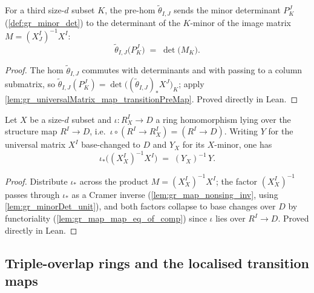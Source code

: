 \begin{lemma}\leanok
  \label{lem:gr_transitionPreMap_minorDet}
  For a third size-\(d\) subset \(K\), the pre-hom \(\tilde\theta_{I,J}\) sends the
  minor determinant \(P^J_K\) (\cref{def:gr_minor_det}) to the determinant of the
  \(K\)-minor of the image matrix \(M = (X^I_J)^{-1} X^I\):
  \[
    \tilde\theta_{I,J}\bigl(P^J_K\bigr) \;=\; \det\bigl(M_K\bigr).
  \]
\end{lemma}
\begin{proof}

\leanok
  The hom \(\tilde\theta_{I,J}\) commutes with determinants and with passing to
  a column submatrix, so \(\tilde\theta_{I,J}(P^J_K) =
  \det\bigl((\tilde\theta_{I,J})_\ast X^J\bigr)_K\); apply
  \cref{lem:gr_universalMatrix_map_transitionPreMap}. Proved directly in Lean.
\end{proof}

\begin{lemma}\leanok
  \label{lem:gr_imageMatrix_map_eq}
  Let \(X\) be a size-\(d\) subset and \(\iota : R^I_X \to D\) a ring
  homomorphism lying over the structure map \(R^I \to D\), i.e.\
  \(\iota \circ (R^I \to R^I_X) = (R^I \to D)\). Writing \(Y\) for the universal
  matrix \(X^I\) base-changed to \(D\) and \(Y_X\) for its \(X\)-minor, one has
  \[
    \iota_\ast\bigl((X^I_X)^{-1} X^I\bigr) \;=\; (Y_X)^{-1}\, Y .
  \]
\end{lemma}
\begin{proof}

\leanok
  Distribute \(\iota_\ast\) across the product \(M = (X^I_X)^{-1} X^I\); the
  factor \((X^I_X)^{-1}\) passes through \(\iota_\ast\) as a Cramer inverse
  (\cref{lem:gr_map_nonsing_inv}, using \cref{lem:gr_minorDet_unit}), and both
  factors collapse to base changes over \(D\) by functoriality
  (\cref{lem:gr_map_map_eq_of_comp}) since \(\iota\) lies over \(R^I \to D\).
  Proved directly in Lean.
\end{proof}

\subsection*{Triple-overlap rings and the localised transition maps}

